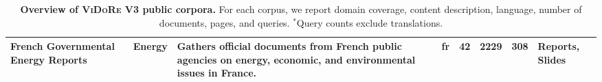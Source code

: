 \begin{table}[t]
{{\begin{tabular}{
    p{4.2cm}
    p{2.2cm}
    p{6.6cm}
    c
    c
    c
    c
    p{2.8cm}
}
\textbf{French Governmental Energy Reports} &
Energy &
Gathers official documents from French public agencies on energy, economic, and environmental issues in France. &
fr & 42 & 2229 & 308 &
Reports, Slides \\
\bottomrule
\end{tabular}%
}%
}

\caption[\textsc{ViDoRe} V3 public corpora overview]{\textbf{Overview of \textsc{ViDoRe} V3 public corpora.} For each corpus, we report domain coverage, content description, language, number of documents, pages, and queries. $^{*}$Query counts exclude translations.}
\label{vidorev3:tab:datasets}
\end{table}

    










